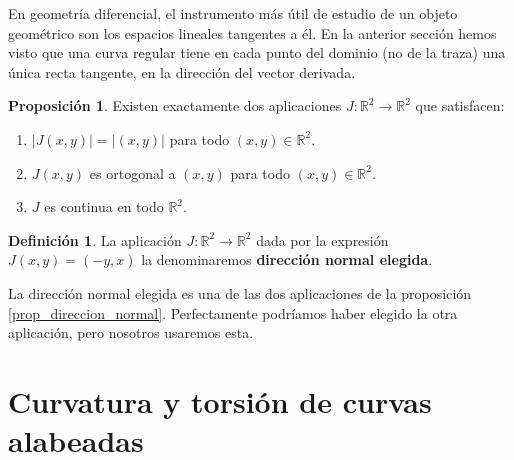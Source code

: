 \documentclass{article}
\theoremstyle{definition}
\newtheorem{prop}{Proposición}
\newtheorem{define}{Definición}
\newcommand{\reales}{\mathbb{R}}
\begin{document}
En geometría diferencial, el instrumento más útil de estudio de un objeto geométrico son los espacios lineales tangentes a él. En la anterior sección hemos visto que una curva regular tiene en cada punto del dominio (no de la traza) una única recta tangente, en la dirección del vector derivada. 

\begin{prop}\label{prop_direccion_normal}
	Existen exactamente dos aplicaciones $J:\reales^{2} \rightarrow \reales^{2}$ que satisfacen:
	\begin{enumerate}
		\item
		$|J(x, y)| = |(x, y)|$ para todo $(x, y) \in \reales^{2}$.
		\item
		$J(x, y)$ es ortogonal a $(x, y)$ para todo $(x, y) \in \reales^{2}$.
		\item
		$J$ es continua en todo $\reales^{2}$.
	\end{enumerate}
\end{prop}

\begin{define}
	La aplicación $J:\reales^{2} \rightarrow \reales^{2}$ dada por la expresión $J(x, y) = (-y, x)$ la denominaremos \textbf{dirección normal elegida}.
\end{define}

La dirección normal elegida es una de las dos aplicaciones de la proposición \eqref{prop_direccion_normal}. Perfectamente podríamos haber elegido la otra aplicación, pero nosotros usaremos esta.



























\section{Curvatura y torsión de curvas alabeadas}
\end{document}
